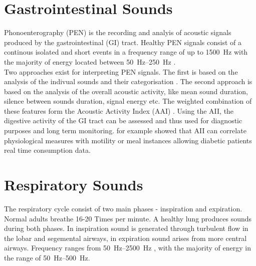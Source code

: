 \documentclass[
	ngerman,
	ruledheaders=section,%
	class=report,%
	thesis={type=report},%
	accentcolor=1c,%
	custommargins=false,%
	marginpar=false,%
	BCOR=5mm,%
	parskip=half-,%
	fontsize=11pt,%
]{tudapub}
\begin{document}
\section{Gastrointestinal Sounds}
Phonoenterography (PEN) is the recording and analyis of acoustic signals produced by the gastrointestinal (GI) tract. 
Healthy PEN signals consist of a continous isolated and short events in a frequency range of up to \SI{1500}{\hertz}  with the majority of energy located between \SIrange{50}{250}{\hertz} \cite{ranta_digestive_2010-2}.
\\Two approaches exist for interpreting PEN signals. The first is based on the analysis of the indivual sounds and their categorisation \cite{dimoulas_bowel-sound_2008}.
The second approach is based on the analysis of the overall acoustic activity, like mean sound duration, silence between
sounds duration, signal energy etc. The weighted combination of these features form the Acoustic Activity Index (AAI) \cite{ranta_digestive_2010-2}.
Using the AII, the digestive activity of the GI tract can be assessed and thus used for diagnostic purposes and long term monitoring.
\cite{mallegni_sensing_2022} for example showed that AII can correlate physiological measures with motility or meal instances allowing diabetic patients real time consumption data. 


\section{Respiratory Sounds}
\label{Respiratory Sounds}
The respiratory cycle consist of two main phases - inspiration and expiration. Normal adults breathe 16-20 Times per minute. 
A healthy lung produces sounds during both phases. In inspiration sound is generated through turbulent flow in the lobar and segemental airways, in expiration sound arises from more central airways. 
Frequency ranges from \SIrange{50}{2500}{\hertz} \cite{andres_respiratory_2018,rao_acoustic_2019}, with the majority of energy in the range of \SIrange{50}{500}{\hertz}\cite{pasterkamp_respiratory_1997}.
\end{document}
